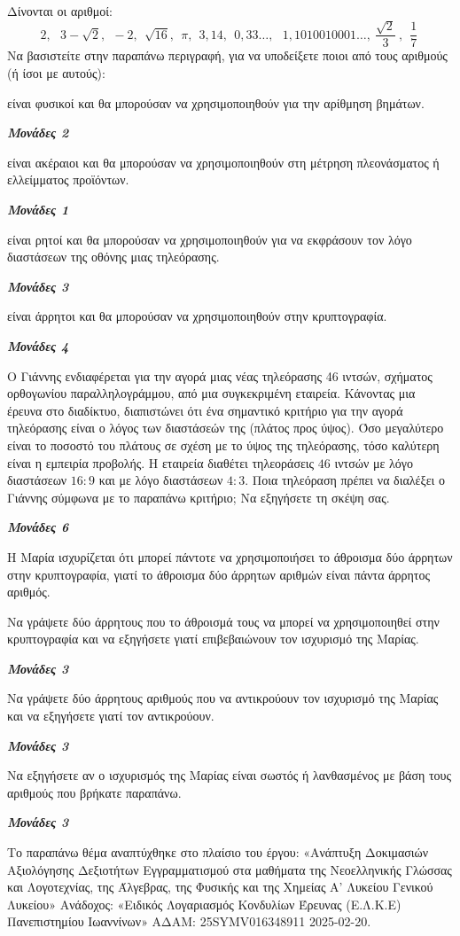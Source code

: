 \documentclass[11pt,a4paper,twoside]{book}
\newcommand{\monades}[1]{
\hspace*{\fill}
\textbf{\textit{\textcolor{maincolor}{Μονάδες #1}}}}
\begin{document}
\begin{alist}
\item Δίνονται οι αριθμοί:
\begin{equation*}2,\ \ \ 3 - \sqrt{2},\ \  - 2,\ \ \sqrt{16},\ \ \pi,\ \ 3,14,\ \ 0,33\ldots,\ \ \ 1,1010010001\ldots,\ \dfrac{\sqrt{2}}{3}\ ,\ \ \dfrac{1}{7}\ \end{equation*}
Να βασιστείτε στην παραπάνω περιγραφή, για να υποδείξετε ποιοι από τους αριθμούς (ή ίσοι με αυτούς):
\begin{rlist}
\item
  είναι φυσικοί και θα μπορούσαν να χρησιμοποιηθούν για την αρίθμηση βημάτων.
\monades{2}
\item
  είναι ακέραιοι και θα μπορούσαν να χρησιμοποιηθούν στη μέτρηση πλεονάσματος ή ελλείμματος προϊόντων.
\monades{1}
\item
  είναι ρητοί και θα μπορούσαν να χρησιμοποιηθούν για να εκφράσουν τον λόγο διαστάσεων της οθόνης μιας τηλεόρασης.
\monades{3}
\item είναι άρρητοι και θα μπορούσαν να χρησιμοποιηθούν στην κρυπτογραφία.
\monades{4}
\end{rlist}
\item Ο Γιάννης ενδιαφέρεται για την αγορά μιας νέας τηλεόρασης 46 ιντσών, σχήματος ορθογωνίου παραλληλογράμμου, από μια συγκεκριμένη εταιρεία. Κάνοντας μια έρευνα στο διαδίκτυο, διαπιστώνει ότι ένα σημαντικό κριτήριο για την αγορά τηλεόρασης είναι ο λόγος των διαστάσεών της (πλάτος προς ύψος). Όσο μεγαλύτερο είναι το ποσοστό του πλάτους σε σχέση με το ύψος της τηλεόρασης, τόσο καλύτερη είναι η εμπειρία προβολής. Η εταιρεία διαθέτει τηλεοράσεις $46$ ιντσών με λόγο διαστάσεων $16:9$ και με λόγο διαστάσεων $4:3$. Ποια τηλεόραση πρέπει να διαλέξει ο Γιάννης σύμφωνα με το παραπάνω κριτήριο; Να εξηγήσετε τη σκέψη σας.
\monades{6}
\item Η Μαρία ισχυρίζεται ότι μπορεί πάντοτε να χρησιμοποιήσει το άθροισμα δύο άρρητων στην κρυπτογραφία, γιατί το άθροισμα δύο άρρητων αριθμών είναι πάντα άρρητος αριθμός.
\begin{rlist}
\item Να γράψετε δύο άρρητους που το άθροισμά τους να μπορεί να χρησιμοποιηθεί στην κρυπτογραφία και να εξηγήσετε γιατί επιβεβαιώνουν τον ισχυρισμό της Μαρίας.
\monades{3}
\item Να γράψετε δύο άρρητους αριθμούς που να αντικρούουν τον ισχυρισμό της Μαρίας και να εξηγήσετε γιατί τον αντικρούουν.
\monades{3}
\item Να εξηγήσετε αν ο ισχυρισμός της Μαρίας είναι σωστός ή λανθασμένος με βάση τους αριθμούς που βρήκατε παραπάνω.
\monades{3}

{\footnotesize Το παραπάνω θέμα αναπτύχθηκε στο πλαίσιο του έργου: «Ανάπτυξη Δοκιμασιών Αξιολόγησης Δεξιοτήτων Εγγραμματισμού στα μαθήματα της Νεοελληνικής Γλώσσας και Λογοτεχνίας, της Άλγεβρας, της Φυσικής και της Χημείας Α' Λυκείου Γενικού Λυκείου» Ανάδοχος: «Ειδικός Λογαριασμός Κονδυλίων Έρευνας (Ε.Λ.Κ.Ε) Πανεπιστημίου Ιωαννίνων» ΑΔΑΜ: 25SYMV016348911 2025-02-20.}
\end{rlist}
\end{alist}
\end{document}
